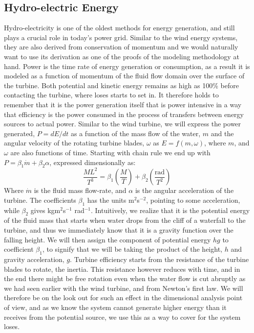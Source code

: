 \subsection{Hydro-electric Energy}
\noindent Hydro-electricity is one of the oldest methods for energy generation, and still plays a crucial role in today's power grid. Similar to the wind energy systems, they are also derived from conservation of momentum and we would naturally want to use its derivation as one of the proofs of the modeling methodology at hand. Power is the time rate of energy generation or consumption, as a result it is modeled as a function of momentum of the fluid flow domain over the surface of the turbine. Both potential and kinetic energy remains as high as 100\% before contacting the turbine, where loses starts to set in. It therefore holds to remember that it is the power generation itself that is power intensive in a way that efficiency is the power consumed in the process of transfers between energy sources to actual power. Similar to the wind turbine, we will express the power generated, $P=dE/dt$ as a function of the mass flow of the water, $m$ and the angular velocity of the rotating turbine blades, $\omega$ as $E =f\left( m,\omega\right)$, where $m$, and $\omega$ are also functions of time. Starting with chain rule we end up with $P = \beta_1\dot{m}+\beta_2\alpha$, expressed dimensionally as: 
\begin{equation}
\frac{ML^2}{T^3} = \beta_1\left( \frac{M}{T}\right) +\beta_2\left( \frac{\text{rad}}{T^2}\right) 
\label{eqn2.25}
\end{equation} 
\noindent Where $\dot{m}$ is the fluid mass flow-rate, and $\alpha$ is the angular acceleration of the turbine. The coefficients $\beta_1$ has the units m$^2$s$^{-2}$, pointing to some acceleration, while $\beta_2$ gives kgm$^2$s$^{-1}$ rad$^{-1}$. Intuitively, we realize that it is the potential energy of the fluid mass that starts when water drops from the cliff of a waterfall to the turbine, and thus we immediately know that it is a gravity function over the falling height. We will then assign the component of potential energy $hg$ to coefficient $\beta_1$, to signify that we will be taking the product of the height, $h$ and gravity acceleration, $g$. Turbine efficiency starts from the resistance of the turbine blades to rotate, the inertia. This resistance however reduces with time, and in the end there might be free rotation even when the water flow is cut abruptly as we had seen earlier with the wind turbine, and from Newton's first law. We will therefore be on the look out for such an effect in the dimensional analysis point of view, and as we know the system cannot generate higher energy than it receives from the potential source, we use this as a way to cover for the system loses. 
